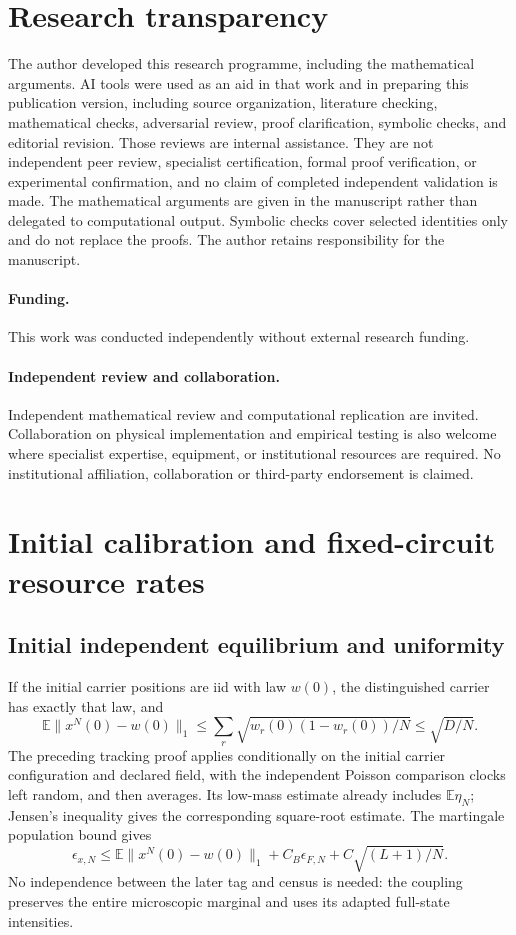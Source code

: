 \documentclass[11pt]{article}
\theoremstyle{definition}\newtheorem{definition}[theorem]{Definition}
\theoremstyle{remark}\newtheorem{remark}[theorem]{Remark}
\newcommand{\E}{\mathbb E}\newcommand{\Prb}{\mathbb P}
\begin{document}
\section*{Research transparency}
The author developed this research programme, including the mathematical arguments. AI tools were used as an aid in that work and in preparing this publication version, including source organization, literature checking, mathematical checks, adversarial review, proof clarification, symbolic checks, and editorial revision. Those reviews are internal assistance. They are not independent peer review, specialist certification, formal proof verification, or experimental confirmation, and no claim of completed independent validation is made. The mathematical arguments are given in the manuscript rather than delegated to computational output. Symbolic checks cover selected identities only and do not replace the proofs. The author retains responsibility for the manuscript.

\paragraph{Funding.} This work was conducted independently without external research funding.

\paragraph{Independent review and collaboration.} Independent mathematical review and computational replication are invited. Collaboration on physical implementation and empirical testing is also welcome where specialist expertise, equipment, or institutional resources are required. No institutional affiliation, collaboration or third-party endorsement is claimed.

\appendix
\section{Initial calibration and fixed-circuit resource rates}\label{app:rates}\subsection{Initial independent equilibrium and uniformity}
If the initial carrier positions are iid with law $w(0)$, the distinguished carrier has exactly that law, and
\[
 \E\|x^N(0)-w(0)\|_1
 \le \sum_r\sqrt{w_r(0)(1-w_r(0))/N}\le\sqrt{D/N}.
\]
The preceding tracking proof applies conditionally on the initial carrier configuration and declared field, with the independent Poisson comparison clocks left random, and then averages. Its low-mass estimate already includes $\mathbb E\eta_N$; Jensen's inequality gives the corresponding square-root estimate. The martingale population bound gives
\[
 \epsilon_{x,N}\le \E\|x^N(0)-w(0)\|_1
       +C_B\epsilon_{F,N}+C\sqrt{(L+1)/N}.
\]
No independence between the later tag and census is needed: the coupling preserves the entire microscopic marginal and uses its adapted full-state intensities.
\end{document}
